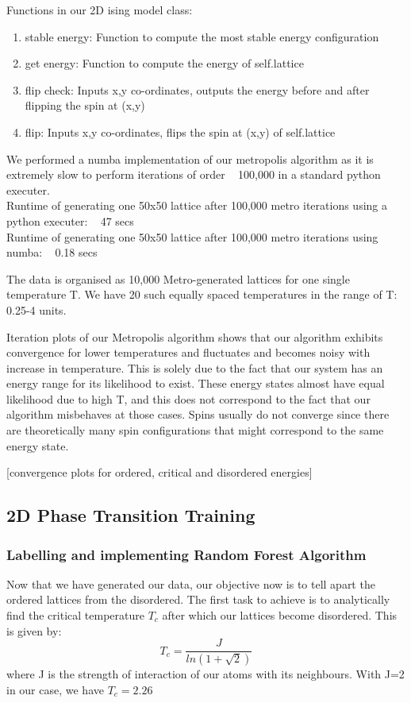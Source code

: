 Functions in our 2D ising model class:
\begin{enumerate}

    \item stable energy: Function to compute the most stable energy configuration
    \item get energy: Function to compute the energy of self.lattice
    \item flip check: Inputs x,y co-ordinates, outputs the energy before and after flipping the spin at (x,y)
    \item flip: Inputs x,y co-ordinates, flips the spin at (x,y) of self.lattice
    
\end{enumerate}

We performed a numba implementation of our metropolis algorithm as it is extremely slow to perform iterations of order ~ 100,000 in a standard python executer. \\
Runtime of generating one 50x50 lattice after 100,000 metro iterations using a python executer: ~ 47 secs\\
Runtime of generating one 50x50 lattice after 100,000 metro iterations using numba: ~ 0.18 secs

The data is organised as 10,000 Metro-generated lattices for one single temperature T. We have 20 such equally spaced temperatures in the range of T: 0.25-4 units. 

Iteration plots of our Metropolis algorithm shows that our algorithm exhibits convergence for lower temperatures and fluctuates and becomes noisy with increase in temperature. This is solely due to the fact that our system has an energy range for its likelihood to exist. These energy states almost have equal likelihood due to high T, and this does not correspond to the fact that our algorithm misbehaves at those cases. Spins usually do not converge since there are theoretically many spin configurations that might correspond to the same energy state.

[convergence plots for ordered, critical and disordered energies]

\subsection{2D Phase Transition Training}
\subsubsection{Labelling and implementing Random Forest Algorithm}
Now that we have generated our data, our objective now is to tell apart the ordered lattices from the disordered. The first task to achieve is to analytically find the critical temperature $T_c$ after which our lattices become disordered. This is given by\cite{onsagar}:
\[T_c=\frac{J}{ln(1+\sqrt{2})}\]
where J is the strength of interaction of our atoms with its neighbours. With J=2 in our case, we have $T_c=2.26$

